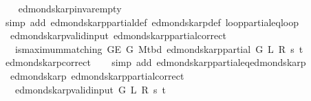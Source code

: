 \begin{isabellebody}
%
\isadelimproof
\ \ %
\endisadelimproof
%
\isatagproof
{}\isamarkupfalse%
\ edmonds{\isacharunderscore}{\kern0pt}karp{\isacharunderscore}{\kern0pt}invar{\isacharunderscore}{\kern0pt}empty\isanewline
\ \ \isamarkupfalse%
\ {\isacharparenleft}{\kern0pt}simp\ add{\isacharcolon}{\kern0pt}\ edmonds{\isacharunderscore}{\kern0pt}karp{\isacharunderscore}{\kern0pt}partial{\isacharunderscore}{\kern0pt}def\ edmonds{\isacharunderscore}{\kern0pt}karp{\isacharunderscore}{\kern0pt}def\ loop{\isacharprime}{\kern0pt}{\isacharunderscore}{\kern0pt}partial{\isacharunderscore}{\kern0pt}eq{\isacharunderscore}{\kern0pt}loop{\isacharprime}{\kern0pt}{\isacharparenright}{\kern0pt}%
\endisatagproof
{\isafoldproof}%
%
\isadelimproof
\isanewline
%
\endisadelimproof
\isanewline
{}\isamarkupfalse%
\ {\isacharparenleft}{\kern0pt}\ edmonds{\isacharunderscore}{\kern0pt}karp{\isacharunderscore}{\kern0pt}valid{\isacharunderscore}{\kern0pt}input{\isacharparenright}{\kern0pt}\ edmonds{\isacharunderscore}{\kern0pt}karp{\isacharunderscore}{\kern0pt}partial{\isacharunderscore}{\kern0pt}correct{\isacharcolon}{\kern0pt}\isanewline
\ \ \ {\isachardoublequoteopen}is{\isacharunderscore}{\kern0pt}maximum{\isacharunderscore}{\kern0pt}matching\ {\isacharparenleft}{\kern0pt}G{\isachardot}{\kern0pt}E\ G{\isacharparenright}{\kern0pt}\ {\isacharparenleft}{\kern0pt}M{\isacharunderscore}{\kern0pt}tbd\ {\isacharparenleft}{\kern0pt}edmonds{\isacharunderscore}{\kern0pt}karp{\isacharunderscore}{\kern0pt}partial\ G\ L\ R\ s\ t{\isacharparenright}{\kern0pt}{\isacharparenright}{\kern0pt}{\isachardoublequoteclose}\isanewline
%
\isadelimproof
\ \ %
\endisadelimproof
%
\isatagproof
{}\isamarkupfalse%
\ edmonds{\isacharunderscore}{\kern0pt}karp{\isacharunderscore}{\kern0pt}correct\isanewline
\ \ \isamarkupfalse%
\ {\isacharparenleft}{\kern0pt}simp\ add{\isacharcolon}{\kern0pt}\ edmonds{\isacharunderscore}{\kern0pt}karp{\isacharunderscore}{\kern0pt}partial{\isacharunderscore}{\kern0pt}eq{\isacharunderscore}{\kern0pt}edmonds{\isacharunderscore}{\kern0pt}karp{\isacharparenright}{\kern0pt}%
\endisatagproof
{\isafoldproof}%
%
\isadelimproof
\isanewline
%
\endisadelimproof
\isanewline
{}\isamarkupfalse%
\ {\isacharparenleft}{\kern0pt}\ edmonds{\isacharunderscore}{\kern0pt}karp{\isacharparenright}{\kern0pt}\ edmonds{\isacharunderscore}{\kern0pt}karp{\isacharunderscore}{\kern0pt}partial{\isacharunderscore}{\kern0pt}correct{\isacharcolon}{\kern0pt}\isanewline
\ \ \ {\isachardoublequoteopen}edmonds{\isacharunderscore}{\kern0pt}karp{\isacharunderscore}{\kern0pt}valid{\isacharunderscore}{\kern0pt}input{\isacharprime}{\kern0pt}\ G\ L\ R\ s\ t{\isachardoublequoteclose}\isanewline

\end{isabellebody}
